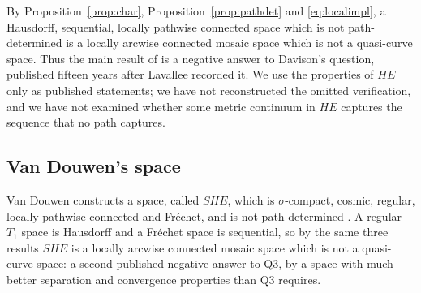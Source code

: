 \documentclass[11pt]{amsart}
\theoremstyle{definition}
\theoremstyle{remark}
\newcommand{\SHE}{\mathit{SHE}}
\newcommand{\HE}{\mathit{HE}}
\numberwithin{equation}{section}
\begin{document}
By Proposition~\ref{prop:char}, Proposition~\ref{prop:pathdet} and \eqref{eq:localimpl}, a Hausdorff, sequential, locally pathwise connected space which is not path-determined is a locally arcwise connected mosaic space which is not a quasi-curve space. Thus the main result of \cite{fst79} is a negative answer to Davison's question, published fifteen years after Lavallee recorded it. We use the properties of $\HE$ only as published statements; we have not reconstructed the omitted verification, and we have not examined whether some metric continuum in $\HE$ captures the sequence that no path captures.

\subsection{Van Douwen's space}\label{sec:vd}
Van Douwen \cite{vandouwen81} constructs a space, called $\SHE$, which is $\sigma$-compact, cosmic, regular, locally pathwise connected and Fr\'echet, and is not path-determined \cite[p.~424]{vandouwen81}. A regular $T_1$ space is Hausdorff and a Fr\'echet space is sequential, so by the same three results $\SHE$ is a locally arcwise connected mosaic space which is not a quasi-curve space: a second published negative answer to Q3, by a space with much better separation and convergence properties than Q3 requires.
\end{document}
